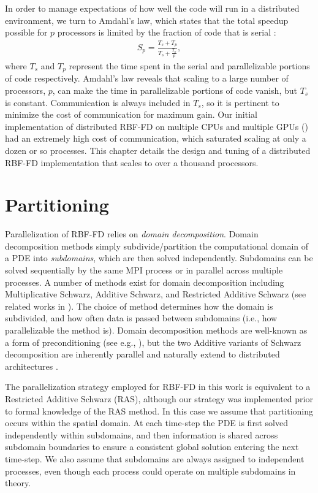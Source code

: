 \documentclass{report}
\begin{document}
In order to manage expectations of how well the code will run in a distributed environment, we turn to Amdahl's law, which states that the total speedup possible for $p$ processors is limited by the fraction of code that is serial \cite{Shi2012}:
\begin{align}
S_p = \frac{T_s + T_p}{T_s + \frac{T_p}{p}},  \nonumber
\end{align}
where $T_s$ and $T_p$ represent the time spent in the serial and parallelizable portions of code respectively. Amdahl's law reveals that scaling to a large number of processors, $p$, can make the time in parallelizable portions of code vanish, but $T_s$ is constant. Communication is always included in $T_s$, so it is pertinent to minimize the cost of communication for maximum gain. Our initial implementation of distributed RBF-FD on multiple CPUs and multiple GPUs (\cite{BolligFlyerErlebacher2012}) had an extremely high cost of communication, which saturated scaling at only a dozen or so processes. This chapter details the design and tuning of a distributed RBF-FD implementation that scales to over a thousand processors. 


\section{Partitioning}

Parallelization of RBF-FD relies on \emph{domain decomposition}. Domain decomposition methods simply subdivide/partition the computational domain of a PDE into \emph{subdomains}, which are then solved independently. Subdomains can be solved sequentially by the same MPI process or in parallel across multiple processes. A number of methods exist for domain decomposition including Multiplicative Schwarz, Additive Schwarz, and Restricted Additive Schwarz (see related works in \cite{Yokota2010,StCyr2007}). The choice of method determines how the domain is subdivided, and how often data is passed between subdomains (i.e., how parallelizable the method is). Domain decomposition methods are well-known as a form of preconditioning (see e.g., \cite{Beatson2000, StCyr2007}), but the two Additive variants of Schwarz decomposition are inherently parallel and naturally extend to distributed architectures \cite{Yokota2010, Gropp1990}. 

The parallelization strategy employed for RBF-FD in this work is equivalent to a Restricted Additive Schwarz (RAS), although our strategy was implemented prior to formal knowledge of the RAS method. In this case we assume that partitioning occurs within the spatial domain. At each time-step the PDE is first solved independently within subdomains, and then information is shared across subdomain boundaries to ensure a consistent global solution entering the next time-step. We also assume that subdomains are always assigned to independent processes, even though each process could operate on multiple subdomains in theory. 
\end{document}
